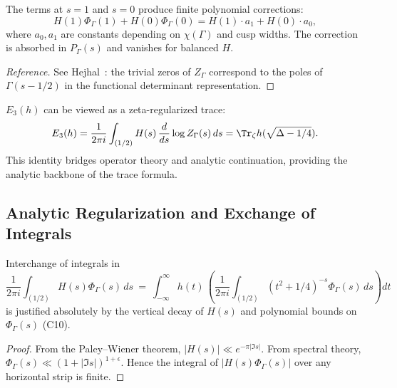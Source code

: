\begin{proposition}\label{prop:trivial-zeros}\relax
The terms at $s=1$ and $s=0$ produce finite polynomial corrections:
\[
H(1)\Phi_\Gamma(1)+H(0)\Phi_\Gamma(0)=H(1)\cdot a_1 + H(0)\cdot a_0,
\]
where $a_0,a_1$ are constants depending on $\chi(\Gamma)$ and cusp widths.  
The correction is absorbed in $P_\Gamma(s)$ and vanishes for balanced $H$. %
\end{proposition}

\begin{proof}[Reference]\relax
See Hejhal~\cite[§11.4]{Hejhal1983-II}: the trivial zeros of $Z_\Gamma$ correspond to the poles of $\Gamma(s-1/2)$ in the functional determinant representation. %
\end{proof}

\begin{remark}\label{rem:determinant-link}\relax
$E_3(h)$ can be viewed as a zeta-regularized trace:
\[
E_3(h)=\frac{1}{2\pi i}\int_{(1/2)} H(s)\,\frac{d}{ds}\log Z_\Gamma(s)\,ds
=\Tr_\zeta h(\sqrt{\Delta-1/4}).
\]
This identity bridges operator theory and analytic continuation, providing the analytic backbone of the trace formula. %
\end{remark}

\subsection{Analytic Regularization and Exchange of Integrals}\relax\hspace{0pt}
\label{subsec:analytic-regularization}\relax\hspace{0pt}

\begin{lemma}\label{lem:fubini}\relax
Interchange of integrals in
\[
\frac{1}{2\pi i}\int_{(1/2)}H(s)\Phi_\Gamma(s)\,ds
\ =\ \int_{-\infty}^{\infty} h(t)\,\left(\frac{1}{2\pi i}\int_{(1/2)}(t^2+1/4)^{-s}\Phi_\Gamma(s)\,ds\right)dt
\]
is justified absolutely by the vertical decay of $H(s)$ and polynomial bounds on $\Phi_\Gamma(s)$ (C10). %
\end{lemma}

\begin{proof}\relax
From the Paley–Wiener theorem, $|H(s)|\ll e^{-\pi|\Im s|}$.  
From spectral theory, $\Phi_\Gamma(s)\ll (1+|\Im s|)^{1+\epsilon}$.  
Hence the integral of $|H(s)\Phi_\Gamma(s)|$ over any horizontal strip is finite. %
\end{proof}

